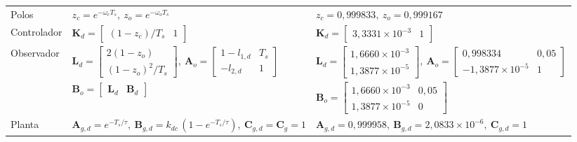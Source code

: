 \begin{table}[tbp]
{\begin{tabular}{lll}
Polos & $z_c = e^{-\omega_c T_s},\ z_o = e^{-\omega_o T_s}$ & $z_c = 0{,}999833,\ z_o = 0{,}999167$ \\
Controlador &
$\mathbf{K}_d = \begin{bmatrix} (1 - z_c)/T_s & 1 \end{bmatrix}$ &
$\mathbf{K}_d = \begin{bmatrix} 3{,}3331\times10^{-3} & 1 \end{bmatrix}$ \\
Observador &
$\mathbf{L}_d = \begin{bmatrix} 2(1 - z_o) \\ (1 - z_o)^2/T_s \end{bmatrix},\
\mathbf{A}_o = \begin{bmatrix} 1 - l_{1,d} & T_s \\ -l_{2,d} & 1 \end{bmatrix}$ &
$\mathbf{L}_d = \begin{bmatrix} 1{,}6660\times10^{-3} \\ 1{,}3877\times10^{-5} \end{bmatrix},\
\mathbf{A}_o = \begin{bmatrix} 0{,}998334 & 0{,}05 \\ -1{,}3877\times10^{-5} & 1 \end{bmatrix}$ \\
 &
$\mathbf{B}_o = \begin{bmatrix} \mathbf{L}_d & \mathbf{B}_d \end{bmatrix}$ &
$\mathbf{B}_o = \begin{bmatrix} 1{,}6660\times10^{-3} & 0{,}05 \\ 1{,}3877\times10^{-5} & 0 \end{bmatrix}$ \\
Planta &
$\mathbf{A}_{g,d} = e^{-T_s/\tau},\ \mathbf{B}_{g,d} = k_{dc}\,(1 - e^{-T_s/\tau}),\ \mathbf{C}_{g,d} = \mathbf{C}_g = 1$ &
$\mathbf{A}_{g,d} = 0{,}999958,\ \mathbf{B}_{g,d} = 2{,}0833\times10^{-6},\ \mathbf{C}_{g,d} = 1$ \\
\bottomrule
\end{tabular}%
}
\end{table}

